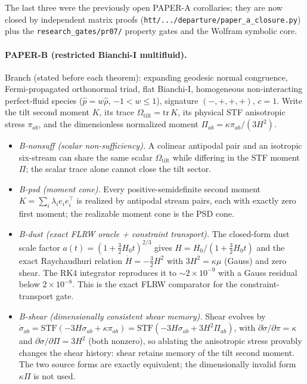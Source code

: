 \documentclass[11pt,a4paper]{article}
\theoremstyle{plain}
\theoremstyle{definition}
\begin{document}
The last three were the previously open PAPER-A corollaries; they are now
closed by independent matrix proofs
(\texttt{htt/.../departure/paper\_a\_closure.py}) plus the
\texttt{research\_gates/pr07/} property gates and the Wolfram symbolic core.

\paragraph{PAPER-B (restricted Bianchi-I multifluid).}
Branch (stated before each theorem): expanding geodesic normal
congruence, Fermi-propagated orthonormal triad, flat Bianchi-I,
homogeneous non-interacting perfect-fluid species ($\hat p=w\hat\rho$,
$-1<w\le1$), signature $(-,+,+,+)$, $c=1$. Write the tilt second
moment $K$, its trace $\Omega_{\mathrm{tilt}}=\mathrm{tr}\,K$, its
physical STF anisotropic stress $\pi_{ab}$, and the dimensionless
normalized moment $\Pi_{ab}=\kappa\pi_{ab}/(3H^2)$.
\begin{itemize}[leftmargin=1.4em,itemsep=2pt]
  \item \emph{B-nonsuff (scalar non-sufficiency).} A colinear
        antipodal pair and an isotropic six-stream can share the same
        scalar $\Omega_{\mathrm{tilt}}$ while differing in the STF
        moment $\Pi$; the scalar trace alone cannot close the tilt
        sector.
  \item \emph{B-psd (moment cone).} Every positive-semidefinite second
        moment $K=\sum_i\lambda_i e_i e_i^{\!\top}$ is realized by
        antipodal stream pairs, each with exactly zero first moment;
        the realizable moment cone is the PSD cone.
  \item \emph{B-dust (exact FLRW oracle + constraint transport).} The
        closed-form dust scale factor
        $a(t)=(1+\tfrac32 H_0 t)^{2/3}$ gives
        $H=H_0/(1+\tfrac32 H_0 t)$ and the exact Raychaudhuri relation
        $\dot H=-\tfrac32 H^2$ with $3H^2=\kappa\mu$ (Gauss) and zero
        shear. The RK4 integrator reproduces it to $\sim2\times10^{-9}$
        with a Gauss residual below $2\times10^{-8}$. This is the exact
        FLRW comparator for the constraint-transport gate.
  \item \emph{B-shear (dimensionally consistent shear memory).} Shear
        evolves by
        $\dot\sigma_{ab}=\mathrm{STF}(-3H\sigma_{ab}+\kappa\pi_{ab})
        =\mathrm{STF}(-3H\sigma_{ab}+3H^2\Pi_{ab})$, with
        $\partial\dot\sigma/\partial\pi=\kappa$ and
        $\partial\dot\sigma/\partial\Pi=3H^2$ (both nonzero), so ablating
        the anisotropic stress provably changes the shear history: shear
        retains memory of the tilt second moment. The two source forms are
        exactly equivalent; the dimensionally invalid form $\kappa\Pi$ is
        not used.
\end{itemize}
\end{document}
